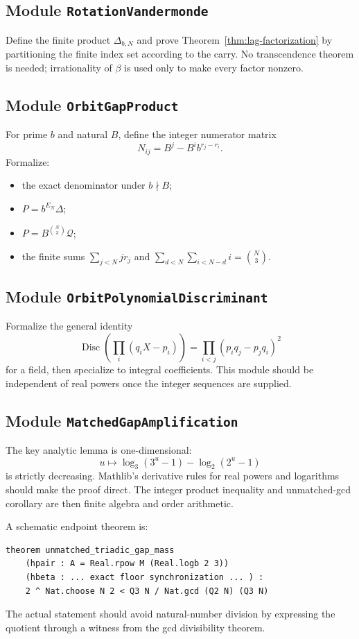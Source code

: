 \documentclass[11pt,oneside]{article}
\theoremstyle{definition}
\theoremstyle{remark}
\begin{document}
\subsection{Module \texttt{RotationVandermonde}}

Define the finite product $\Delta_{b,N}$ and prove Theorem~\ref{thm:lag-factorization} by
partitioning the finite index set according to the carry.  No transcendence theorem is needed;
irrationality of $\beta$ is used only to make every factor nonzero.

\subsection{Module \texttt{OrbitGapProduct}}

For prime $b$ and natural $B$, define the integer numerator matrix
\[
 N_{ij}=B^j-B^i b^{r_j-r_i}.
\]
Formalize:
\begin{itemize}
\item the exact denominator under $b\nmid B$;
\item $P=b^{E_N}\Delta$;
\item $P=B^{\binom N3}\mathcal Q$;
\item the finite sums $\sum_{j<N}jr_j$ and
      $\sum_{d<N}\sum_{i<N-d}i=\binom N3$.
\end{itemize}

\subsection{Module \texttt{OrbitPolynomialDiscriminant}}

Formalize the general identity
\[
 \operatorname{Disc}\left(\prod_i(q_iX-p_i)\right)
 =\prod_{i<j}(p_iq_j-p_jq_i)^2
\]
for a field, then specialize to integral coefficients.  This module should be independent of
real powers once the integer sequences are supplied.

\subsection{Module \texttt{MatchedGapAmplification}}

The key analytic lemma is one-dimensional:
\[
 u\mapsto\log_3(3^u-1)-\log_2(2^u-1)
\]
is strictly decreasing.  Mathlib's derivative rules for real powers and logarithms should make
the proof direct.  The integer product inequality and unmatched-gcd corollary are then finite
algebra and order arithmetic.

A schematic endpoint theorem is:
\begin{verbatim}
theorem unmatched_triadic_gap_mass
    (hpair : A = Real.rpow M (Real.logb 2 3))
    (hbeta : ... exact floor synchronization ... ) :
    2 ^ Nat.choose N 2 < Q3 N / Nat.gcd (Q2 N) (Q3 N)
\end{verbatim}
The actual statement should avoid natural-number division by expressing the quotient through a
witness from the gcd divisibility theorem.
\end{document}
